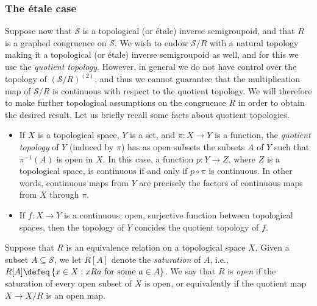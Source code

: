 \subsubsection{The étale case}

Suppose now that $\mathcal{S}$ is a topological (or étale) inverse semigroupoid, and that $R$ is a graphed congruence on $\mathcal{S}$. We wish to endow $\mathcal{S}/R$ with a natural topology making it a topological (or étale) inverse semigroupoid as well, and for this we use the \emph{quotient topology}. However, in general we do not have control over the topology of $(\mathcal{S}/R)^{(2)}$, and thus we cannot guarantee that the multiplication map of $\mathcal{S}/R$ is continuous with respect to the quotient topology. We will therefore to make further topological assumptions on the congruence $R$ in order to obtain the desired result. Let us briefly recall some facts about quotient topologies.

\begin{itemize}
    \item If $X$ is a topological space, $Y$ is a set, and $\pi\colon X\to Y$ is a function, the \emph{quotient topology} of $Y$ (induced by $\pi$) has as open subsets the subsets $A$ of $Y$ such that $\pi^{-1}(A)$ is open in $X$. In this case, a function $p\colon Y\to Z$, where $Z$ is a topological space, is continuous if and only if $p\circ\pi$ is continuous. In other words, continuous maps from $Y$ are precisely the factors of continuous maps from $X$ through $\pi$.
    \item If $f\colon X\to Y$ is a continuous, open, surjective function between topological spaces, then the topology of $Y$ concides the quotient topology of $f$.
\end{itemize}

Suppose that $R$ is an equivalence relation on a topological space $X$. Given a subset $A\subseteq\mathcal{S}$, we let $R[A]$ denote the \emph{saturation} of $A$, i.e., $R[A]\defeq\left\{x\in X:xRa\text{ for some }a\in A\right\}$. 
We say that $R$ is \emph{open} if the saturation of every open subset of $X$ is open, or equivalently if the quotient map $X\to X/R$ is an open map.

